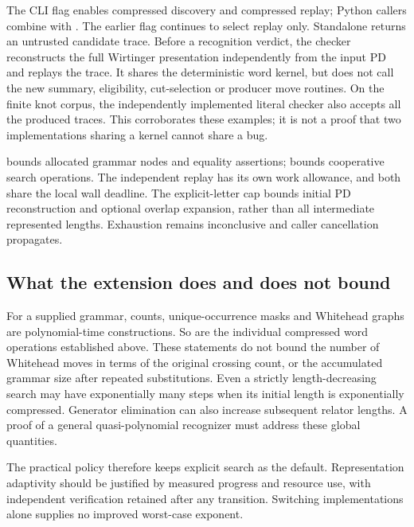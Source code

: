 The CLI flag  enables compressed discovery
and compressed replay; Python callers combine
 with .
The earlier  flag continues to select replay only.
Standalone  returns an untrusted candidate
trace. Before a recognition verdict, the checker reconstructs the full
Wirtinger presentation independently from the input PD and replays the
trace. It shares the deterministic word kernel, but does not call the new
summary, eligibility, cut-selection or producer move routines. On the
finite knot corpus, the independently implemented literal checker also
accepts all the produced traces. This corroborates these examples; it is
not a proof that two implementations sharing a kernel cannot share a bug.

 bounds allocated grammar nodes and equality assertions;
 bounds cooperative search operations. The independent
replay has its own work allowance, and both share the local wall deadline.
The explicit-letter cap bounds initial PD reconstruction and optional
overlap expansion, rather than all intermediate represented lengths.
Exhaustion remains inconclusive and caller cancellation propagates.

\subsection{What the extension does and does not bound}

For a supplied grammar, counts, unique-occurrence masks and Whitehead
graphs are polynomial-time constructions. So are the individual compressed
word operations established above. These statements do not bound the
number of Whitehead moves in terms of the original crossing count, or
the accumulated grammar size after repeated substitutions. Even a
strictly length-decreasing search may have exponentially many steps when
its initial length is exponentially compressed. Generator elimination can
also increase subsequent relator lengths. A proof of a general
quasi-polynomial recognizer must address these global quantities.

The practical policy therefore keeps explicit search as the default.
Representation adaptivity should be justified by measured progress and
resource use, with independent verification retained after any transition.
Switching implementations alone supplies no improved worst-case exponent.

